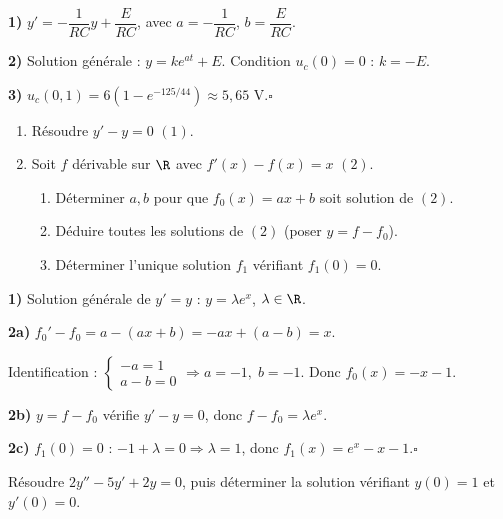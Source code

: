 \begin{Correction}
\textbf{1)} $y'=-\dfrac{1}{RC}y+\dfrac{E}{RC}$, avec $a=-\dfrac{1}{RC}$, $b=\dfrac{E}{RC}$.

\textbf{2)} Solution g\'en\'erale : $y=ke^{at}+E$. Condition $u_c(0)=0$ : $k=-E$.

\textbf{3)} $u_c(0{,}1)=6(1-e^{-125/44})\approx 5{,}65$ V.\hfill$\square$
\end{Correction}

\begin{ExoResolu}
\begin{enumerate}
  \item R\'esoudre $y'-y=0$ \quad $(1)$.
  \item Soit $f$ d\'erivable sur $\R$ avec $f'(x)-f(x)=x$ \quad $(2)$.
    \begin{enumerate}[label=\alph*)]
      \item D\'eterminer $a,b$ pour que $f_0(x)=ax+b$ soit solution de $(2)$.
      \item D\'eduire toutes les solutions de $(2)$ (poser $y=f-f_0$).
      \item D\'eterminer l'unique solution $f_1$ v\'erifiant $f_1(0)=0$.
    \end{enumerate}
\end{enumerate}
\end{ExoResolu}

\begin{Correction}
\textbf{1)} Solution g\'en\'erale de $y'=y$ : $y=\lambda e^x$, $\lambda\in\R$.

\textbf{2a)} $f_0'-f_0=a-(ax+b)=-ax+(a-b)=x$.

Identification : $\begin{cases}-a=1\\a-b=0\end{cases} \Rightarrow a=-1,\;b=-1$.
Donc $f_0(x)=-x-1$.

\textbf{2b)} $y=f-f_0$ v\'erifie $y'-y=0$, donc $f-f_0=\lambda e^x$.

\textbf{2c)} $f_1(0)=0$ : $-1+\lambda=0 \Rightarrow \lambda=1$, donc $f_1(x)=e^x-x-1$.\hfill$\square$
\end{Correction}

\begin{ExoResolu}
R\'esoudre $2y''-5y'+2y=0$, puis d\'eterminer la solution
v\'erifiant $y(0)=1$ et $y'(0)=0$.
\end{ExoResolu}

